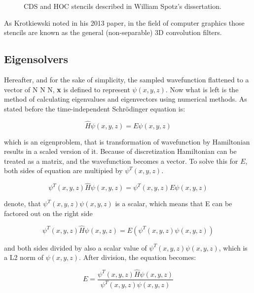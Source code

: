 \begin{figure}[t]
	\caption{CDS and HOC stencils described in William Spotz's dissertation. \cite{spotz1996hoc}}
	\label{fig:stencils}
\end{figure}


As Krotkiewski noted in his 2013 paper, in the field of computer graphics those stencils are known as the general (non-separable) 3D convolution filters.\cite{krotkiewski2013efficient} 




\subsection{Eigensolvers}
Hereafter, and for the sake of simplicity, the sampled wavefunction flattened to a vector of N \times N \times N, \textbf{x} is defined to represent $\psi(x,y,z)$. Now what is left is the method of calculating eigenvalues and eigenvectors using numerical methods. As stated before the time-independent Schr{\"o}dinger equation is:

\begin{equation}
	\hat{H} \psi(x,y,z) = E \psi(x,y,z)
\end{equation}

\noindent which is an eigenproblem,
that is transformation of wavefunction by Hamiltonian results in a scaled version of it. Because of discretization Hamiltonian can be treated as a matrix, and the wavefunction becomes a vector. To solve this for $E$, both sides of equation are multipied by $\psi^T(x,y,z).$

\begin{equation}
	\psi^T(x,y,z) \hat{H} \psi(x,y,z) = \psi^T(x,y,z) E \psi(x,y,z)
\end{equation}

\noindent denote, that $\psi^T(x,y,z)\psi(x,y,z)$ is a scalar, which means that E can be factored out on the right side

\begin{equation}
	\psi^T(x,y,z) \hat{H} \psi(x,y,z) = E(\psi^T(x,y,z) \psi(x,y,z))
\end{equation}

\noindent and both sides divided by also a scalar value of $\psi^T(x,y,z) \psi(x,y,z)$, which is a L2 norm of $\psi(x,y,z)$. After division, the equation becomes:

\begin{equation}
	E = \frac{\psi^T(x,y,z) \hat{H} \psi(x,y,z)}{\psi^T(x,y,z) \psi(x,y,z)}
\end{equation}

